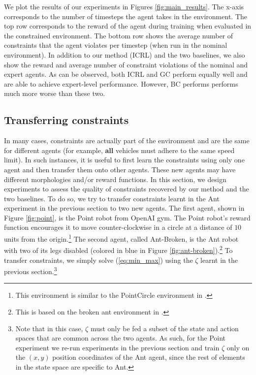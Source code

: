 \documentclass{article}
\begin{document}
We plot the results of our experiments in Figures \ref{fig:main_results}. The x-axis corresponds to the number of timesteps the agent takes in the environment. The top row corresponds to the reward of the agent during training when evaluated in the constrained environment. The bottom row shows the average number of constraints that the agent violates per timestep (when run in the nominal environment). In addition to our method (ICRL) and the two baselines, we also show the reward and average number of constraint violations of the nominal and expert agents. As can be observed, both ICRL and GC perform equally well and are able to achieve expert-level performance. However, BC performs performs much more worse than these two.

\subsection{Transferring constraints} 
In many cases, constraints are actually part of the environment and are the same for different agents (for example, \textbf{all} vehicles must adhere to the same speed limit). In such instances, it is useful to first learn the constraints using only one agent and then transfer them onto other agents. These new agents may have different morphologies and/or reward functions. In this section, we design experiments to assess the quality of constraints recovered by our method and the two baselines. To do so, we try to transfer constraints learnt in the Ant experiment in the previous section to two new agents. The first agent, shown in Figure \ref{fig:point}, is the Point robot from OpenAI gym. The Point robot's reward function encourages it to move counter-clockwise in a circle at a distance of $10$ units from the origin.\footnote{This environment is similar to the PointCircle environment in \citet{achiam2017cpo}.} The second agent, called Ant-Broken, is the Ant robot with two of its legs disabled (colored in blue in Figure \ref{fig:ant-broken}).\footnote{This is based on the broken ant environment in \citet{eysenbach2020off}.} To transfer constraints, we simply solve (\ref{eq:min_max}) using the $\zeta$ learnt in the previous section.\footnote{Note that in this case, $\zeta $ must only be fed a subset of the state and action spaces that are common across the two agents. As such, for the Point experiment we re-run experiments in the previous section and train $\zeta$ only on the $(x,y)$ position coordinates of the Ant agent, since the rest of elements in the state space are specific to Ant.}
\end{document}
